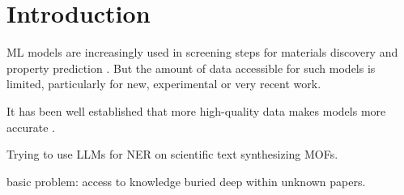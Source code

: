 \chapter{Introduction}\label{chap:introduction}


\gls{ML} models are increasingly used in screening steps for materials discovery and property prediction \cite{saal_machine_2020, luo_mof_2022, choudhary_recent_2022}. 
But the amount of data accessible for such models is limited, particularly for new, experimental or very recent work.

It has been well established that more high-quality data makes models more accurate \cite{hoffmann_empirical_2022}.

Trying to use \glspl{LLM} for \gls{NER} on scientific text synthesizing \glspl{MOF}.

basic problem: access to knowledge buried deep within unknown papers.





